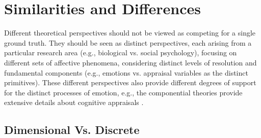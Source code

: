 \documentclass[11pt]{article}
\begin{document}
\section{Similarities and Differences}

Different theoretical perspectives should not be viewed as competing for a
single ground truth. They should be seen as distinct perspectives, each arising
from a particular research area (e.g., biological vs. social psychology),
focusing on different sets of affective phenomena, considering distinct levels
of resolution and fundamental components (e.g., emotions vs. appraisal variables
as the distinct primitives). These different perspectives also provide different
degrees of support for the distinct processes of emotion, e.g., the componential
theories provide extensive details about cognitive appraisals
\cite{hudlicka:guidelines-emotions}.

\subsection{Dimensional Vs. Discrete}
\end{document}

